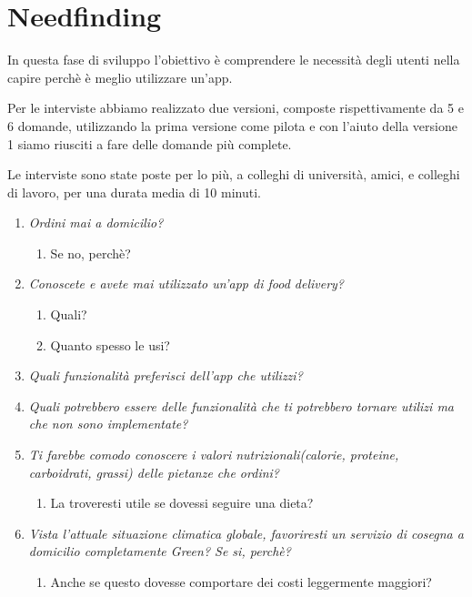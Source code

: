 \documentclass{article}
\begin{document}
    \vspace{1cm}
\section{Needfinding} 
In questa fase di sviluppo l’obiettivo è comprendere le necessità degli utenti nella capire perchè è meglio utilizzare un'app.
    \vspace{1cm}
     \par
\par Per le interviste abbiamo realizzato due versioni, composte rispettivamente da 5 e 6 domande, utilizzando la prima versione come pilota e con l'aiuto della versione 1 siamo riusciti a fare delle domande più complete. \par Le interviste sono state poste per lo più, a colleghi di università, amici, e colleghi di lavoro, per una durata media di 10 minuti.\par
  \vspace{1cm}
\par{}
    \begin{enumerate}
    
     \item \textit{Ordini mai a domicilio?}
        \begin{enumerate}
            \item Se no, perchè?
        \end{enumerate}
     \item \textit{Conoscete e avete mai utilizzato un'app di food delivery?}
     \begin{enumerate}
         \item Quali?
         \item Quanto spesso le usi?
     \end{enumerate}
     \item \textit{Quali funzionalità preferisci dell'app che utilizzi?}
     \item \textit{Quali potrebbero essere delle funzionalità che ti potrebbero tornare utilizi ma che non sono implementate?}
    \item \textit{Ti farebbe comodo conoscere i valori nutrizionali(calorie, proteine, carboidrati, grassi) delle pietanze che ordini?}
    \begin{enumerate}
        \item La troveresti utile se dovessi seguire una dieta?
    \end{enumerate}
    \item \textit{Vista l'attuale situazione climatica globale, favoriresti un servizio di cosegna a domicilio completamente Green? Se si, perchè? }
    \begin{enumerate}
        \item Anche se questo dovesse comportare dei costi leggermente maggiori?
    \end{enumerate}
\end{enumerate}
\end{document}
